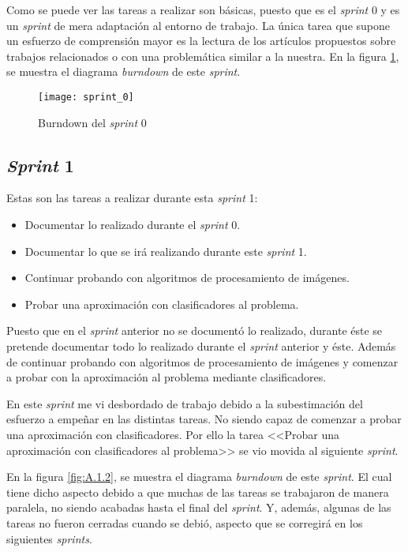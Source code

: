 Como se puede ver las tareas a realizar son básicas, puesto que es el \textit{sprint} 0 y es un \textit{sprint} de mera adaptación al entorno de trabajo. La única tarea que supone un esfuerzo de comprensión mayor es la lectura de los artículos propuestos sobre trabajos relacionados o con una problemática similar a la nuestra. En la figura \ref{fig:A.1.1}, se muestra el diagrama \textit{burndown} de este \textit{sprint}. 

\begin{figure}
\centering
\texttt{[image: sprint\_0]}
\caption{Burndown del \textit{sprint} 0}
\label{fig:A.1.1}
\end{figure}

\subsection{\textit{Sprint} 1}
Estas son las tareas a realizar durante esta \textit{sprint} 1:

\begin{itemize}
	\item Documentar lo realizado durante el \textit{sprint} 0.
	\item Documentar lo que se irá realizando durante este \textit{sprint} 1.
	\item Continuar probando con algoritmos de procesamiento de imágenes.
	\item Probar una aproximación con clasificadores al problema.
\end{itemize}

Puesto que en el \textit{sprint} anterior no se documentó lo realizado, durante éste se pretende documentar todo lo realizado durante el \textit{sprint} anterior y éste. Además de continuar probando con algoritmos de procesamiento de imágenes y comenzar a probar con la aproximación al problema mediante clasificadores.

En este \textit{sprint} me vi desbordado de trabajo debido a la subestimación del esfuerzo a empeñar en las distintas tareas. No siendo capaz de comenzar a probar una aproximación con clasificadores. Por ello la tarea <<Probar una aproximación con clasificadores al problema>> se vio movida al siguiente \textit{sprint}. 

En la figura \ref{fig:A.1.2}, se muestra el diagrama \textit{burndown} de este \textit{sprint}. El cual tiene dicho aspecto debido a que muchas de las tareas se trabajaron de manera paralela, no siendo acabadas hasta el final del \textit{sprint}. Y, además, algunas de las tareas no fueron cerradas cuando se debió, aspecto que se corregirá en los siguientes \textit{sprints}.

